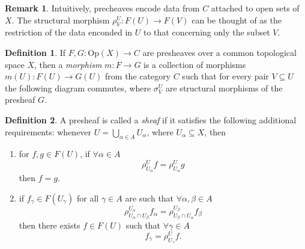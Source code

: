 \documentclass{article}
\theoremstyle{definition}
\newtheorem{definition}{Definition}
\newtheorem*{remark}{Remark}
\begin{document}
\begin{remark}
    Intuitively, precheaves encode data from $C$ attached to open sets of $X$. The structural morphism $\rho_V^U: F(U) \rightarrow F(V)$ can be thought of as the restriction of the data enconded in $U$ to that concerning only the subset $V$.
\end{remark}

\begin{definition}
    If $F, G: \text{Op}(X) \rightarrow C$ are presheaves over a common topological space $X$, then a \emph{morphism} $m: F \rightarrow G$ is a collection of morphisms $m(U): F(U) \rightarrow G(U)$ from the category $C$ such that for every pair $V \subseteq U$ the following diagram commutes, where $\sigma_V^U$ are structural morphisms of the presheaf $G$.
\end{definition}

\begin{figure}[ht]
    \centering
\end{figure}

\begin{definition}
    \label{def:sheaf}
    A presheaf is called a \emph{sheaf} if it satisfies the following additional requirements: whenever $U = \bigcup_{\alpha \in A} U_\alpha$, where $U_\alpha \subseteq X$, then
    
    \begin{enumerate}
        \item for $f, g \in F(U)$, if $\forall \alpha \in A$
        \begin{equation*}
            \rho_{U_\alpha}^U f = \rho_{U_\alpha}^U g
        \end{equation*}
        then $f = g$.
        \item if $f_\gamma \in F(U_\gamma)$ for all $\gamma \in A$ are such that $\forall \alpha, \beta \in A$
        \begin{equation*}
            \rho_{U_\alpha \cap U_\beta}^{U_\alpha} f_\alpha
            = \rho_{U_\beta \cap U_\alpha}^{U_\beta} f_\beta
        \end{equation*}
        then there exists $f \in F(U)$ such that $\forall \gamma \in A$
        \begin{equation*}
            f_\gamma = \rho_{U_\gamma}^U f.
        \end{equation*}
    \end{enumerate}
\end{definition}
\end{document}

